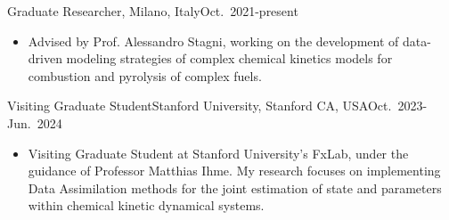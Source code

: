 \begin{position}{Graduate Researcher}{\polimi, Milano, Italy}{Oct.~2021-present}
    \begin{itemize}
        \item[ ] Advised by Prof. Alessandro Stagni, working on the development of
              data-driven modeling strategies of complex chemical kinetics models for
              combustion and pyrolysis of complex fuels.
    \end{itemize}
\end{position}

\begin{position}{Visiting Graduate Student}{Stanford University, Stanford CA, USA}{Oct.~2023-Jun.~2024}
    \begin{itemize}
        \item[ ] Visiting Graduate Student at Stanford University's FxLab, under the guidance of
              Professor Matthias Ihme. My research focuses on implementing Data Assimilation
              methods for the joint estimation of state and parameters within chemical kinetic
              dynamical systems.
    \end{itemize}
\end{position}
